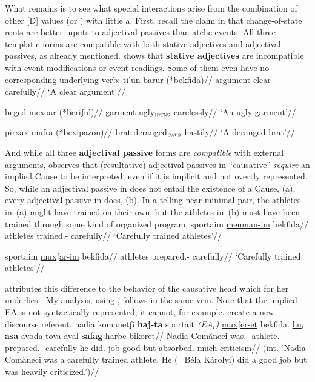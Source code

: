 What remains is to see what special interactions arise from the combination of other [D] values (or {\va}) with little a. First, recall the claim in \cite{doron00} that change-of-state roots are better inputs to adjectival passives than atelic events. All three templatic forms are compatible with both stative adjectives and adjectival passives, as already mentioned. \citet[170]{doron14adj} shows that \textbf{stative adjectives} are incompatible with event modifications or event readings. Some of them even have no corresponding underlying verb:
\pex
	\a \begingl
		\gla ti'un \underline{barur} (*bekfida)//
		\glb argument clear \phantom{(*}carefully//
		\glft `A clear argument'//
	\endgl

	\a \begingl
		\gla beged \underline{mexoar} (*beriʃul)//
		\glb garment ugly$_{\text{\gsc{INTNS}}}$ \phantom{(*}carelessly//
		\glft `An ugly garment'//
	\endgl

	\a \begingl
		\gla pirxax \underline{mufra} (*bexipazon)//
		\glb brat deranged$_{\text{\gsc{CAUS}}}$ \phantom{(*}hastily//
		\glft `A deranged brat'//
	\endgl
\xe

And while all three \textbf{adjectival passive} forms are \emph{compatible} with external arguments, \citet[175]{doron14adj} observes that (resultative) adjectival passives in ``causative'' {\mhuf} \emph{require} an implied Cause to be interpreted, even if it is implicit and not overtly represented. So, while an adjectival passive in {\mpua} does not entail the existence of a Cause, (\nextx a), every adjectival passive in {\mhuf} does, (\nextx b). In a telling near-minimal pair, the athletes in~(\nextx a) might have trained on their own, but the athletes in~(\nextx b) must have been trained through some kind of organized program.
\pex\label{ex:sportaim}
	\a \begingl
		\gla\rightcomment{(\mpua)}sportaim \underline{meuman-im} bekfida//
		\glb athletes trained.- carefully//
		\glft `Carefully trained athletes'//
	\endgl
	
	\a \begingl
		\gla\rightcomment{(\mhuf)}sportaim \underline{muxʃar-im} bekfida//
		\glb athletes prepared.- carefully//
		\glft `Carefully trained athletes'//
	\endgl
\xe

\cite{doron14adj} attributes this difference to the behavior of the causative head  which for her underlies {\thif}. My analysis, using {\vd}, follows in the same vein. Note that the implied EA is not syntactically represented; it cannot, for example, create a new discourse referent.
\ex\label{ex:sportait} \ljudge{*}
	\begingl
		\gla nadia komanetʃi \textbf{haj-ta} sportait \emph{(EA$_i$)} \underline{muxʃer-et} bekfida. \underline{hu$_i$} \textbf{asa} avoda tova aval \textbf{safag} harbe bikoret//
		\glb Nadia Com\u{a}neci was.- athlete. {} prepared.- carefully he did. job good but absorbed. much criticism//
		\glft (int. `Nadia Com\u{a}neci was a carefully trained athlete. He (=B\'ela K\'arolyi) did a good job but was heavily criticized.')//
	\endgl
\xe

